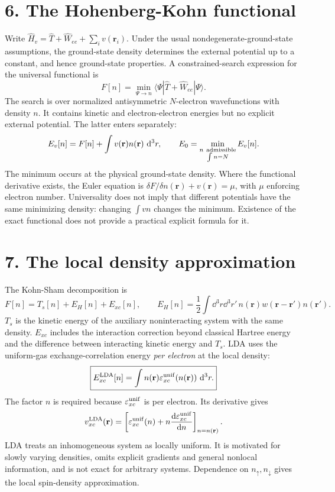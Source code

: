 \section*{6. The Hohenberg-Kohn functional}
Write $\hat H_v=\hat T+\hat W_{ee}+\sum_i v(\mathbf r_i)$. Under the usual nondegenerate-ground-state assumptions, the ground-state density determines the external potential up to a constant, and hence ground-state properties. A constrained-search expression for the universal functional is
\[
\boxed{F[n]=\min_{\Psi\to n}\langle\Psi|\hat T+\hat W_{ee}|\Psi\rangle.}
\]
The search is over normalized antisymmetric $N$-electron wavefunctions with density $n$. It contains kinetic and electron-electron energies but no explicit external potential. The latter enters separately:
\[
E_v[n]=F[n]+\int v(\mathbf r)n(\mathbf r)\,\mathop{}\!\mathrm{d}^3r,\qquad
E_0=\min_{\substack{n\ {\rm admissible}\\ \int n=N}}E_v[n].
\]
The minimum occurs at the physical ground-state density. Where the functional derivative exists, the Euler equation is
$\delta F/\delta n(\mathbf r)+v(\mathbf r)=\mu$,
with $\mu$ enforcing electron number.
Universality does not imply that different potentials have the same minimizing density: changing $\int vn$ changes the minimum. Existence of the exact functional does not provide a practical explicit formula for it.

\section*{7. The local density approximation}
The Kohn-Sham decomposition is
\[
F[n]=T_s[n]+E_H[n]+E_{xc}[n],\qquad
E_H[n]=\frac12\int\dd^3r\dd^3r'\,n(\mathbf r)w(\mathbf r-\mathbf r')n(\mathbf r').
\]
$T_s$ is the kinetic energy of the auxiliary noninteracting system with the same density. $E_{xc}$ includes the interaction correction beyond classical Hartree energy and the difference between interacting kinetic energy and $T_s$. LDA uses the uniform-gas exchange-correlation energy \emph{per electron} at the local density:
\[
\boxed{E_{xc}^{\rm LDA}[n]=\int n(\mathbf r)
\varepsilon_{xc}^{\rm unif}(n(\mathbf r))\,\mathop{}\!\mathrm{d}^3r.}
\]
The factor $n$ is required because $\varepsilon_{xc}^{\rm unif}$ is per electron. Its derivative gives
\[
v_{xc}^{\rm LDA}(\mathbf r)=
\left[\varepsilon_{xc}^{\rm unif}(n)+n\frac{\mathop{}\!\mathrm{d}\varepsilon_{xc}^{\rm unif}}{\mathop{}\!\mathrm{d} n}\right]_{n=n(\mathbf r)}.
\]
LDA treats an inhomogeneous system as locally uniform. It is motivated for slowly varying densities, omits explicit gradients and general nonlocal information, and is not exact for arbitrary systems. Dependence on $n_\uparrow,n_\downarrow$ gives the local spin-density approximation.

